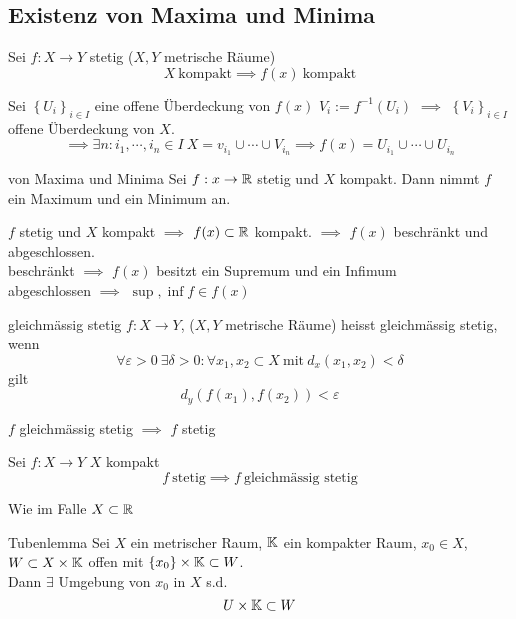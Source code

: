 \subsection{Existenz von Maxima und Minima}
\begin{Sat}
  Sei $f:X\to Y$ stetig ($X,Y$ metrische Räume)
  \[X\ \text{kompakt}\implies f(x)\ \text{kompakt}\]
\end{Sat}
\begin{Bew}
  Sei $\left\{ U_i \right\}_{i\in I}$ eine offene Überdeckung von $f(x)$ $V_i:=f^{-1}(U_i)$ $\implies$ $\left\{ V_i \right\}_{i\in I}$ offene Überdeckung von $X$.
  \[\implies\exists n:i_1,\cdots,i_n\in I\ X=v_{i_1}\cup\cdots\cup V_{i_n}\implies f(x)=U_{i_1}\cup\cdots\cup U_{i_n}\]
\end{Bew}
\begin{Sat}{von Maxima und Minima}
  Sei $f:x\to\mathbb{R}$ stetig und $X$ kompakt. Dann nimmt $f$ ein Maximum und ein Minimum an.
\end{Sat}
\begin{Bew}
  $f$ stetig und $X$ kompakt $\implies$ $f(x)\subset\mathbb{R}$ kompakt. $\implies$ $f(x)$ beschränkt und abgeschlossen.\\
  beschränkt $\implies$ $f(x)$ besitzt ein Supremum und ein Infimum\\
  abgeschlossen $\implies$ $\sup, \inf f\in f(x)$
\end{Bew}
\begin{Def}{gleichmässig stetig}
  $f:X\to Y$, ($X,Y$ metrische Räume) heisst gleichmässig stetig, wenn
  \[\forall\varepsilon>0\ \exists \delta>0:\forall x_1,x_2\subset X\ \text{mit}\ d_x(x_1,x_2)<\delta\]
  gilt
  \[d_y\left( f(x_1),f(x_2) \right)<\varepsilon\]
\end{Def}
\begin{Bem}
  $f$ gleichmässig stetig $\implies$ $f$ stetig
\end{Bem}
\begin{Sat}
  Sei $f:X\to Y$ $X$ kompakt
  \[f\ \text{stetig}\implies f\ \text{gleichmässig stetig}\]
\end{Sat}
\begin{Bew}
  Wie im Falle $X\subset\mathbb{R}$  
\end{Bew}
\begin{Lem}{Tubenlemma}
  Sei $X$ ein metrischer Raum, $\mathbb{K}$ ein kompakter Raum, $x_0\in X$, $W\subset X\times \mathbb{K}$ offen mit $\left\{ x_0 \right\}\times\mathbb{K}\subset W$.\\
  Dann $\exists$ Umgebung von $x_0$ in $X$ s.d. \[U\times\mathbb{K}\subset W\]
\end{Lem}
